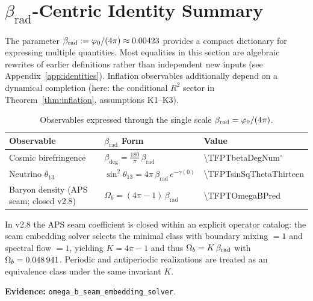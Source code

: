 \section{\texorpdfstring{$\beta_{\text{rad}}$-Centric Identity Summary}{beta_rad-Centric Identity Summary}}

The parameter $\beta_{\text{rad}} := \varphi_0/(4\pi) \approx 0.00423$ provides a compact dictionary for expressing multiple quantities. 
Most equalities in this section are algebraic rewrites of earlier definitions rather than independent new inputs (see Appendix~\ref{app:identities}). 
Inflation observables additionally depend on a dynamical completion (here: the conditional $R^2$ sector in Theorem~\ref{thm:inflation}, assumptions K1--K3).

\begin{table}[H]
\centering
\begin{tabular}{@{}lll@{}}
\toprule
\textbf{Observable} & \textbf{$\beta_{\text{rad}}$ Form} & \textbf{Value}\\
\midrule
Cosmic birefringence & $\beta_{\text{deg}} = \frac{180}{\pi}\,\beta_{\text{rad}}$ & \num[round-mode=places,round-precision=4]{\TFPTbetaDegNum}$^\circ$\\
Neutrino $\theta_{13}$ & $\sin^2\theta_{13} = 4\pi\,\beta_{\text{rad}}\,e^{-\gamma(0)}$ & \num[round-mode=places,round-precision=6]{\TFPTsinSqThetaThirteen}\\
Baryon density (APS seam; closed v2.8) & $\Omega_b = (4\pi - 1)\,\beta_{\text{rad}}$ & \num[round-mode=places,round-precision=6]{\TFPTOmegaBPred}\\
\bottomrule
\end{tabular}
\caption{Observables expressed through the single scale $\beta_{\text{rad}} = \varphi_0/(4\pi)$.}
\label{tab:beta}
\end{table}

\begin{remark}
In v2.8 the APS seam coefficient is closed within an explicit operator catalog:
the seam embedding solver selects the minimal class with boundary mixing $=1$ and spectral flow $=1$,
yielding $K=4\pi-1$ and thus $\Omega_b=K\,\beta_{\rm rad}$ with $\Omega_b=\num[round-mode=places,round-precision=6]{\TFPTOmegaBPred}$.
Periodic and antiperiodic realizations are treated as an equivalence class under the same invariant $K$.

\textbf{Evidence:} \texttt{omega\_b\_seam\_embedding\_solver}.
\end{remark}

